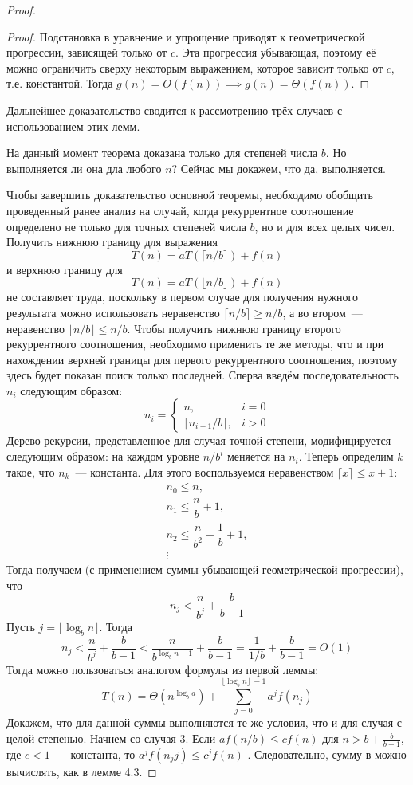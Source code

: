 \documentclass[a4paper,12pt]{article}
\begin{document}
\begin{proof}
\begin{proof}
		Подстановка в уравнение и упрощение приводят к геометрической прогрессии, зависящей только от $c$. Эта прогрессия убывающая, поэтому её можно ограничить сверху некоторым выражением, которое зависит только от $c$, т.е. константой. Тогда $g(n) = O(f(n)) \implies g(n) = \Theta(f(n))$.
	\end{proof}
	Дальнейшее доказательство сводится к рассмотрению трёх случаев с использованием этих лемм.
	
	На данный момент теорема доказана только для степеней числа $b$. Но выполняется ли она дла любого $n$? Сейчас мы докажем, что да, выполняется.
	
	Чтобы завершить доказательство основной теоремы, необходимо обобщить проведенный ранее анализ на случай, когда рекуррентное соотношение определено не только для точных степеней числа $b$, но и для всех целых чисел. Получить
	нижнюю границу для выражения
	\[T(n) = aT(\lceil n/b \rceil) + f(n)\]
	и верхнюю границу для
	\[T(n) = aT(\lfloor n/b \rfloor) + f(n)\]
	не составляет труда, поскольку в первом случае для получения нужного результата можно использовать неравенство $\lceil n/b \rceil \geqslant n/b$, а во втором~--- неравенство $\lfloor n/b \rfloor \leqslant n/b$. Чтобы получить нижнюю границу второго рекуррентного 
	соотношения, необходимо применить те же методы, что и при нахождении верхней границы для первого рекуррентного соотношения, поэтому здесь будет показан поиск только последней. 
	Сперва введём последовательность $n_i$ следующим образом:
	\[n_i = \begin{cases}
	n, & i = 0 \\
	\lceil n_{i - 1}/b \rceil, & i > 0
	\end{cases}\]
	Дерево рекурсии, представленное для случая точной степени, модифицируется следующим образом: на каждом уровне $n/b^i$ меняется на $n_i$. Теперь определим $k$ такое, что $n_k$~--- константа. Для этого воспользуемся неравенством $\lceil x \rceil \leqslant x + 1$:
	\[\begin{array}{c}
		n_0 \leqslant n, \\
		n_1 \leqslant \dfrac{n}{b} + 1, \\
		n_2 \leqslant \dfrac{n}{b^2} + \dfrac{1}{b} + 1, \\
		\vdots
	\end{array}\]
	Тогда получаем (с применением суммы убывающей геометрической прогрессии), что
	\[n_j < \frac{n}{b^j} + \frac{b}{b - 1}\]
	Пусть $j = \lfloor \log_b n \rfloor$. Тогда
	\[n_j < \frac{n}{b^j} + \frac{b}{b - 1} < \frac{n}{b^{\log_b n - 1}} + \frac{b}{b - 1} = \frac{1}{1/b} + \frac{b}{b - 1} = O(1)\]
	Тогда можно пользоваться аналогом формулы из первой леммы:
	 \[T(n) = \Theta(n^{\log_b a}) + \sum_{j = 0}^{\lfloor \log_b n \rfloor\ - 1}a^j f(n_j)\]
	 Докажем, что для данной суммы выполняются те же условия, что и для случая с целой степенью. Начнем со случая 3. Если $af(n/b) \leqslant cf(n)$ для $n > b + \frac{b}{b - 1}$,
	 где $c < 1$~--- константа, то $a^jf(n_jj) \leqslant c^jf(n)$ . Следовательно, сумму в можно вычислять, как в лемме 4.3. 
	 

\end{proof}
\end{document}
